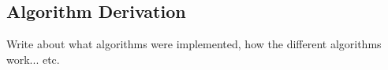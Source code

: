 
\subsection{Algorithm Derivation}
Write about what algorithms were implemented, how the different algorithms work... etc.